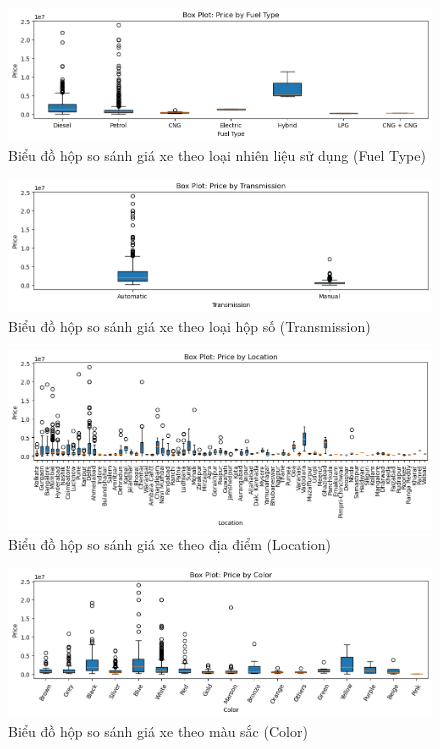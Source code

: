 \begin{figure}[H]
    \centering
    \includegraphics[width=1\linewidth]{img/boxplot-fueltype.png}
    \caption{Biểu đồ hộp so sánh giá xe theo loại nhiên liệu sử dụng (Fuel Type)}
    \label{fig:boxplot-fueltype}
\end{figure}

\begin{figure}[H]
    \centering
    \includegraphics[width=1\linewidth]{img/boxplot-transmission.png}
    \caption{Biểu đồ hộp so sánh giá xe theo loại hộp số (Transmission)}
    \label{fig:boxplot-transmission}
\end{figure}

\begin{figure}[H]
    \centering
    \includegraphics[width=1\linewidth]{img/boxplot-location.png}
    \caption{Biểu đồ hộp so sánh giá xe theo địa điểm (Location)}
    \label{fig:boxplot-location}
\end{figure}

\begin{figure}[H]
    \centering
    \includegraphics[width=1\linewidth]{img/boxplot-color.png}
    \caption{Biểu đồ hộp so sánh giá xe theo màu sắc (Color)}
    \label{fig:boxplot-color}
\end{figure}

